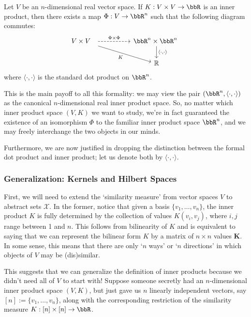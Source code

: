 \documentclass[twoside,11pt]{homework}
\begin{document}
\begin{proposition}\label{finite-IP}
  Let $V$ be an $n$-dimensional real vector space. If $K : V \times V \to \bbR$ is an inner product, then there exists a map $\Phi: V \to \bbR^n$ such that the following diagram commutes:
  \[\begin{tikzcd}
V \times V\ \  \arrow[dashed, rr, "\Phi \times \Phi"] \arrow[drr, "K"'] & & \bbR^n \times \bbR^n \ \arrow[d, "{\langle\cdot,\cdot \rangle}"] \\
& & \mathbb{R}
\end{tikzcd}
\]
  where $\langle \cdot, \cdot \rangle$ is the standard dot product on $\bbR^n$.
\end{proposition}
This is the main payoff to all this formality: we may view the pair $(\bbR^n, \langle\cdot,\cdot\rangle)$ as the canonical $n$-dimensional real inner product space. So, no matter which inner product space $(V,K)$ we want to study, we're in fact guaranteed the existence of an isomorphism $\Phi$ to the familiar inner product space $\bbR^n$, and we may freely interchange the two objects in our minds.

Furthermore, we are now justified in dropping the distinction between the formal dot product and inner product; let us denote both by $\langle \cdot, \cdot\rangle$.

\subsubsection{Generalization: Kernels and Hilbert Spaces}
First, we will need to extend the `similarity measure' from vector spaces $V$ to abstract sets $\mathcal{X}$. In the former, notice that given a basis $\{v_1,\dotsc, v_n\}$, the inner product $K$ is fully determined by the collection of values $K(v_i,v_j)$, where $i,j$ range between 1 and $n$. This follows from bilinearity of $K$ and is equivalent to saying that we can represent the bilinear form $K$ by a matrix of $n\times n$ values $\mathbf{K}$. In some sense, this means that there are only `$n$ ways' or `$n$ directions' in which objects of $V$ may be (dis)similar.

This suggests that we can generalize the definition of inner products because we didn't need all of $V$ to start with! Suppose someone secretly had an $n$-dimensional inner product space $(V,K)$, but just gave us $n$ linearly independent vectors, say $[n] := \{v_1,\dotsc, v_n\}$, along with the corresponding restriction of the similarity measure $K: [n] \times [n] \to \bbR$.
\end{document}
